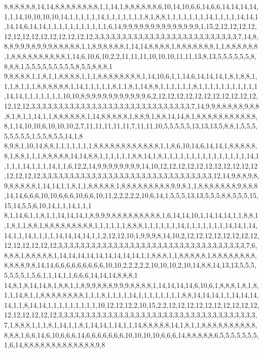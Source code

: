 8,8,8,8,8,8,14,14,8,8,8,8,8,8,8,8,1,1,14,1,8,8,8,8,8,8,6,10,14,10,6,6,14,6,6,14,14,14,14,1,1,14,10,10,10,10,14,1,1,1,1,1,14,1,1,1,1,1,1,1,8,1,8,8,1,1,1,1,1,1,1,14,1,1,1,1,14,14,1,14,14,6,14,14,1,1,1,1,1,1,1,1,1,1,1,6,14,9,9,9,9,9,9,9,9,9,9,9,9,9,9,1,15,2,12,12,12,12,12,12,12,12,12,12,12,12,12,12,3,3,3,3,3,3,3,3,3,3,3,3,3,3,3,3,3,3,3,3,3,3,3,3,3,3,7,14,8,8,8,9,9,9,8,9,9,9,8,8,8,8,8,1,1,8,9,8,8,8,8,1,14,14,8,8,8,8,1,8,8,8,8,8,8,8,1,1,8,8,8,8,8,8,1,8,8,8,8,8,8,8,8,8,8,1,14,6,10,6,10,2,2,11,11,11,10,10,10,11,11,13,8,13,5,5,5,5,5,5,8,8,8,8,1,5,5,5,5,5,5,5,5,5,8,5,5,8,8,8,1
9,8,8,8,8,1,1,8,1,1,8,8,8,8,1,1,1,8,8,8,8,8,8,8,8,1,14,10,6,1,1,14,6,14,14,14,1,8,1,8,8,1,1,1,8,1,1,1,8,8,8,8,8,8,1,14,1,1,1,1,1,8,1,1,8,1,14,8,8,1,1,1,1,1,1,8,1,1,1,1,1,1,1,1,1,1,1,14,14,1,1,1,1,1,1,1,10,10,8,9,9,9,9,9,9,9,9,9,9,9,6,2,12,12,12,12,12,12,12,12,12,12,12,12,12,12,3,3,3,3,3,3,3,3,3,3,3,3,3,3,3,3,3,3,3,3,3,3,3,3,3,3,3,3,3,7,14,9,9,8,8,8,8,8,9,8,8,8,1,8,1,1,14,1,1,8,8,8,8,8,8,1,14,8,8,8,8,8,1,8,8,9,1,8,8,14,14,8,1,8,8,8,8,8,8,8,8,8,8,8,8,1,14,10,10,6,10,10,10,2,7,11,11,11,11,11,7,11,11,10,5,5,5,5,5,13,13,13,5,8,8,1,5,5,5,5,5,5,5,5,1,5,5,8,5,5,14,1,8
8,9,8,1,10,14,8,8,1,1,1,1,1,1,1,8,8,8,8,8,8,8,8,8,8,8,8,1,1,8,6,10,14,6,14,14,1,8,8,8,8,8,8,1,8,8,1,1,1,8,8,8,8,8,14,14,8,8,1,1,1,1,1,1,8,8,14,1,8,1,1,1,1,1,1,1,1,1,1,1,1,1,1,1,14,1,1,1,1,14,1,1,1,14,1,1,6,12,2,14,9,9,9,9,9,9,9,9,14,10,12,12,12,12,12,12,12,12,12,12,12,12,12,12,12,3,3,3,3,3,3,3,3,3,3,3,3,3,3,3,3,3,3,3,3,3,3,3,3,3,3,3,3,3,3,3,12,14,9,8,8,9,8,9,8,8,8,8,8,1,14,14,1,1,8,1,1,8,8,8,8,8,1,8,8,8,8,8,8,8,8,8,9,9,8,1,1,8,8,8,8,8,8,8,9,8,8,8,14,14,6,6,6,10,10,6,6,6,10,6,6,10,11,2,2,2,2,2,10,6,14,1,5,5,5,13,13,5,5,5,8,8,5,5,5,15,15,14,5,5,6,10,14,1,1,14,1,1,1
8,1,14,6,1,1,8,1,1,14,14,14,1,8,9,9,9,8,8,8,8,8,8,8,8,8,1,6,14,14,10,1,14,14,14,1,1,8,8,1,1,8,1,1,8,8,1,8,8,8,8,8,8,8,8,8,1,1,1,1,1,1,8,8,8,1,1,1,1,1,1,14,1,1,1,1,1,1,1,14,14,1,14,14,1,1,14,1,1,1,1,14,14,14,14,1,1,2,12,12,10,1,9,9,9,8,14,10,2,12,12,12,12,12,12,12,12,12,12,12,12,12,12,3,3,3,3,3,3,3,3,3,3,3,3,3,3,3,3,3,3,3,3,3,3,3,3,3,3,3,3,3,3,3,3,3,3,7,6,8,8,8,1,8,8,8,8,8,1,14,14,14,14,14,14,14,14,14,1,1,8,8,8,1,1,8,8,8,8,8,1,8,8,8,8,8,8,8,8,8,8,8,8,9,8,14,14,6,6,6,6,6,6,6,6,6,10,10,2,2,2,2,2,10,10,10,2,10,14,8,8,14,13,13,5,5,5,5,5,5,5,1,5,6,1,1,14,1,1,6,6,6,14,14,14,8,8,8,1
14,8,1,8,14,14,8,1,8,8,1,1,8,9,9,8,8,8,9,9,9,8,8,8,8,1,14,14,14,14,6,10,6,1,8,8,8,1,8,1,8,1,1,14,8,1,1,8,8,8,8,8,8,8,8,1,1,1,8,1,1,1,1,14,1,1,1,1,1,1,1,1,8,8,14,14,14,1,1,14,14,14,14,1,1,8,14,14,1,1,1,1,1,1,1,1,1,10,12,12,12,2,10,15,2,2,12,12,12,12,12,12,12,12,12,12,12,12,12,12,12,12,3,3,3,3,3,3,3,3,3,3,3,3,3,3,3,3,3,3,3,3,3,3,3,3,3,3,3,3,3,3,3,3,3,3,3,3,7,1,8,8,8,1,1,1,8,1,14,1,1,8,1,14,14,1,14,1,1,14,8,8,8,8,8,14,1,8,1,1,8,8,8,8,8,8,8,8,8,8,8,8,8,1,6,6,14,6,10,6,6,6,14,6,6,6,6,6,6,6,10,10,10,10,6,6,6,14,8,8,8,8,8,6,5,5,5,5,5,5,5,1,6,14,8,8,8,8,8,8,8,8,8,8,8,8,8,9,8

